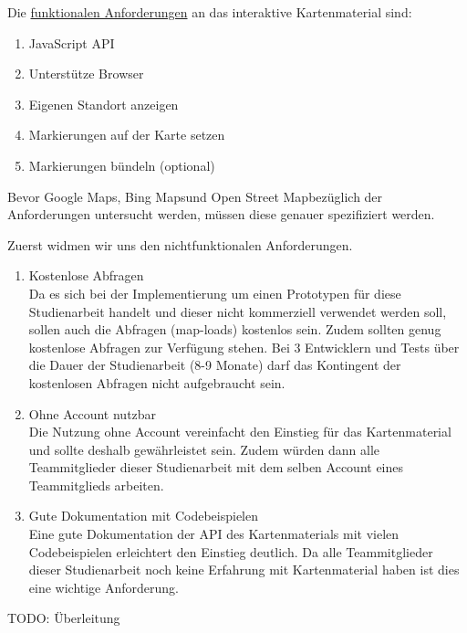 Die \underline{funktionalen Anforderungen} an das interaktive Kartenmaterial sind:
\begin{enumerate}
\item JavaScript API
\item Unterstütze Browser
\item Eigenen Standort anzeigen
\item Markierungen auf der Karte setzen
\item Markierungen bündeln (optional)
\end{enumerate}

Bevor \glqq Google Maps\grqq, \glqq Bing Maps\grqq  und \glqq Open Street Map\grqq bezüglich der Anforderungen untersucht werden, müssen diese genauer spezifiziert werden.

Zuerst widmen wir uns den nichtfunktionalen Anforderungen.
\begin{enumerate}
\item Kostenlose Abfragen \\
Da es sich bei der Implementierung um einen Prototypen für diese Studienarbeit handelt und dieser nicht kommerziell verwendet werden soll, sollen auch die Abfragen (map-loads) kostenlos sein. Zudem sollten genug kostenlose Abfragen zur Verfügung stehen. Bei 3 Entwicklern und Tests über die Dauer der Studienarbeit (8-9 Monate) darf das Kontingent der kostenlosen Abfragen nicht aufgebraucht sein.

\item Ohne Account nutzbar\\
Die Nutzung ohne Account vereinfacht den Einstieg für das Kartenmaterial und sollte deshalb gewährleistet sein. Zudem würden dann alle Teammitglieder dieser Studienarbeit mit dem selben Account eines Teammitglieds arbeiten. 

\item Gute Dokumentation mit Codebeispielen\\
Eine gute Dokumentation der API des Kartenmaterials mit vielen Codebeispielen erleichtert den Einstieg deutlich. Da alle Teammitglieder dieser Studienarbeit noch keine Erfahrung mit Kartenmaterial haben ist dies eine wichtige Anforderung. 


\end{enumerate}



TODO: Überleitung

